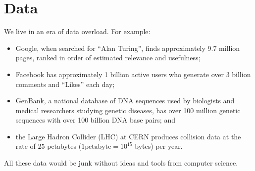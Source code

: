 \documentclass[8pt,a4paper,compress,handout]{beamer}
\begin{document}
\section{Data}
\begin{frame}[fragile]

We live in an era of data overload. For example:
\begin{itemize}
\item Google, when searched for ``Alan Turing'', finds approximately 9.7 million pages, ranked in order of estimated relevance and usefulness; 
\item Facebook has approximately 1 billion active users who generate over 3 billion comments and ``Likes'' each day; 
\item GenBank, a national database of DNA sequences used by biologists and medical researchers studying genetic diseases, has over 100 million genetic sequences with over 100 billion DNA base pairs; and 
\item the Large Hadron Collider (LHC) at CERN produces collision data at the rate of 25 petabytes ($1 \text{petabyte} = 10^{15}$ bytes) per year.
\end{itemize}

\bigskip

All these data would be junk without ideas and tools from computer science.
\end{frame}
\end{document}

